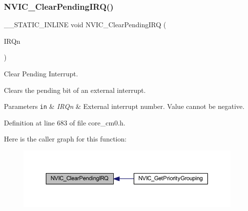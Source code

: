 \subsubsection{\texorpdfstring{N\+V\+I\+C\+\_\+\+Clear\+Pending\+I\+R\+Q()}{NVIC\_ClearPendingIRQ()}}
{\footnotesize\ttfamily \+\_\+\+\_\+\+S\+T\+A\+T\+I\+C\+\_\+\+I\+N\+L\+I\+NE void N\+V\+I\+C\+\_\+\+Clear\+Pending\+I\+RQ (\begin{DoxyParamCaption}\item[{\hyperlink{group___configuration__section__for___c_m_s_i_s_gac3af4a32370fb28c4ade8bf2add80251}{I\+R\+Qn\+\_\+\+Type}}]{I\+R\+Qn }\end{DoxyParamCaption})}



Clear Pending Interrupt. 

Clears the pending bit of an external interrupt. 
\begin{DoxyParams}[1]{Parameters}
\mbox{\tt in}  & {\em I\+R\+Qn} & External interrupt number. Value cannot be negative. \\
\hline
\end{DoxyParams}


Definition at line 683 of file core\+\_\+cm0.\+h.

Here is the caller graph for this function\+:
\nopagebreak
\begin{figure}[H]
\begin{center}
\leavevmode
\includegraphics[width=350pt]{group___c_m_s_i_s___core___n_v_i_c_functions_ga332e10ef9605dc6eb10b9e14511930f8_icgraph}
\end{center}
\end{figure}
\mbox{\label{group___c_m_s_i_s___core___n_v_i_c_functions_ga3387607fd8a1a32cccd77d2ac672dd96}} 
